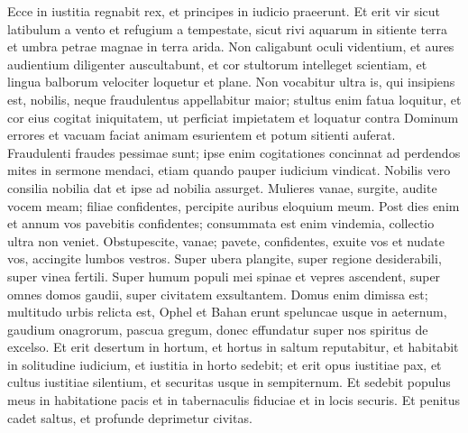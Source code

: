 \begin{biblechapter}
\begin{biblechapter}
\begin{biblechapter}
\begin{biblechapter}
\begin{biblechapter}
\begin{biblechapter}
\begin{biblechapter}
\begin{biblechapter}
\begin{biblechapter}
\begin{biblechapter}
\begin{biblechapter}
\begin{biblechapter}
\begin{biblechapter}
\begin{biblechapter}
\begin{biblechapter}
\begin{biblechapter}
\begin{biblechapter}
\begin{biblechapter}
\begin{biblechapter}
\begin{biblechapter}
\begin{biblechapter}
\begin{biblechapter}
\begin{biblechapter}
\begin{biblechapter}
\begin{biblechapter}
\begin{biblechapter}
\begin{biblechapter}
\begin{biblechapter}
\begin{biblechapter}
\begin{biblechapter}
\begin{biblechapter}
\begin{biblechapter}
\verse Ecce in iustitia regnabit rex,
 et principes in iudicio praeerunt.
 \verse Et erit vir sicut latibulum a vento
 et refugium a tempestate,
 sicut rivi aquarum in sitiente terra
 et umbra petrae magnae in terra arida.
 \verse Non caligabunt oculi videntium,
 et aures audientium diligenter auscultabunt,
 \verse et cor stultorum intelleget scientiam,
 et lingua balborum velociter loquetur et plane.
 \verse Non vocabitur ultra is, qui insipiens est, nobilis,
 neque fraudulentus appellabitur maior;
 \verse stultus enim fatua loquitur,
 et cor eius cogitat iniquitatem,
 ut perficiat impietatem
 et loquatur contra Dominum errores
 et vacuam faciat animam esurientem
 et potum sitienti auferat.
 \verse Fraudulenti fraudes pessimae sunt;
 ipse enim cogitationes concinnat
 ad perdendos mites in sermone mendaci,
 etiam quando pauper iudicium vindicat.
 \verse Nobilis vero consilia nobilia dat
 et ipse ad nobilia assurget.
 \verse Mulieres vanae, surgite, audite vocem meam;
 filiae confidentes, percipite auribus eloquium meum.
 \verse Post dies enim et annum
 vos pavebitis confidentes;
 consummata est enim vindemia,
 collectio ultra non veniet.
 \verse Obstupescite, vanae;
 pavete, confidentes,
 exuite vos et nudate vos,
 accingite lumbos vestros.
 \verse Super ubera plangite,
 super regione desiderabili,
 super vinea fertili.
 \verse Super humum populi mei
 spinae et vepres ascendent,
 super omnes domos gaudii,
 super civitatem exsultantem.
 \verse Domus enim dimissa est;
 multitudo urbis relicta est,
 Ophel et Bahan erunt speluncae
 usque in aeternum,
 gaudium onagrorum,
 pascua gregum,
 \verse donec effundatur super nos
 spiritus de excelso.
 Et erit desertum in hortum,
 et hortus in saltum reputabitur,
 \verse et habitabit in solitudine iudicium,
 et iustitia in horto sedebit;
 \verse et erit opus iustitiae pax,
 et cultus iustitiae silentium,
 et securitas usque in sempiternum.
 \verse Et sedebit populus meus in habitatione pacis
 et in tabernaculis fiduciae
 et in locis securis.
 \verse Et penitus cadet saltus,
 et profunde deprimetur civitas.

\end{biblechapter}
\end{biblechapter}
\end{biblechapter}
\end{biblechapter}
\end{biblechapter}
\end{biblechapter}
\end{biblechapter}
\end{biblechapter}
\end{biblechapter}
\end{biblechapter}
\end{biblechapter}
\end{biblechapter}
\end{biblechapter}
\end{biblechapter}
\end{biblechapter}
\end{biblechapter}
\end{biblechapter}
\end{biblechapter}
\end{biblechapter}
\end{biblechapter}
\end{biblechapter}
\end{biblechapter}
\end{biblechapter}
\end{biblechapter}
\end{biblechapter}
\end{biblechapter}
\end{biblechapter}
\end{biblechapter}
\end{biblechapter}
\end{biblechapter}
\end{biblechapter}
\end{biblechapter}
